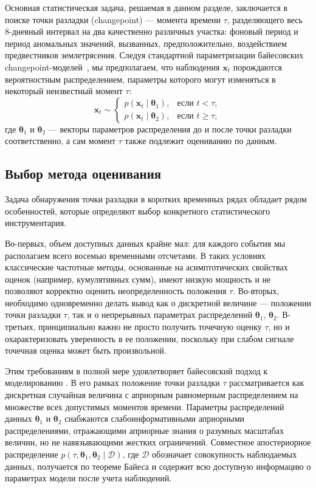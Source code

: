 \documentclass[14pt]{mmcs_article}
\begin{document}
Основная статистическая задача, решаемая в данном
разделе, заключается в поиске точки разладки
(changepoint) — момента времени $\tau$, разделяющего
весь 8-дневный интервал на два качественно различных
участка: фоновый период и период аномальных значений,
вызванных, предположительно, воздействием предвестников
землетрясения. Следуя стандартной параметризации
байесовских changepoint-моделей~\cite{%
	DavidPil2015, carlin1992hierarchical}, мы предполагаем,
что наблюдения $\mathbf{x}_t$ порождаются вероятностным
распределением, параметры которого могут изменяться в
некоторый неизвестный момент $\tau$:
\begin{equation}
	\mathbf{x}_t \sim 
	\begin{cases}
		p(\mathbf{x}_t \mid \boldsymbol{\theta}_1),
		& \text{если } t < \tau, \\
		p(\mathbf{x}_t \mid \boldsymbol{\theta}_2),
		& \text{если } t \geq \tau,
	\end{cases}
\end{equation}
где $\boldsymbol{\theta}_1$ и $\boldsymbol{\theta}_2$ —
векторы параметров распределения до и после точки
разладки соответственно, а сам момент $\tau$ также
подлежит оцениванию по данным.

\subsection*{Выбор метода оценивания}

Задача обнаружения точки разладки в коротких временных рядах обладает рядом особенностей, которые определяют выбор конкретного статистического инструментария. 

Во-первых, объем доступных данных крайне мал: для каждого события мы располагаем всего восемью временными отсчетами. В таких условиях классические частотные методы, основанные на асимптотических свойствах оценок (например, кумулятивных сумм), имеют низкую мощность и не позволяют корректно оценить неопределенность положения $\tau$.\cite{bayes_on_R} Во-вторых, необходимо одновременно делать вывод как о дискретной величине — положении точки разладки $\tau$, так и о непрерывных параметрах распределений $\boldsymbol{\theta}_1$, $\boldsymbol{\theta}_2$. В-третьих, принципиально важно не просто получить точечную оценку $\tau$, но и охарактеризовать уверенность в ее положении, поскольку при слабом сигнале точечная оценка может быть произвольной.

Этим требованиям в полной мере удовлетворяет байесовский подход к моделированию \cite{bayes_on_R, DavidPil2015}. В его рамках положение точки разладки $\tau$ рассматривается как дискретная случайная величина с априорным равномерным распределением на множестве всех допустимых моментов времени. Параметры распределений данных $\boldsymbol{\theta}_1$ и $\boldsymbol{\theta}_2$ снабжаются слабоинформативными априорными распределениями, отражающими априорные знания о разумных масштабах величин, но не навязывающими жестких ограничений. Совместное апостериорное распределение $p(\tau, \boldsymbol{\theta}_1, \boldsymbol{\theta}_2 \mid \mathcal{D})$, где $\mathcal{D}$ обозначает совокупность наблюдаемых данных, получается по теореме Байеса и содержит всю доступную информацию о параметрах модели после учета наблюдений.
\end{document}
